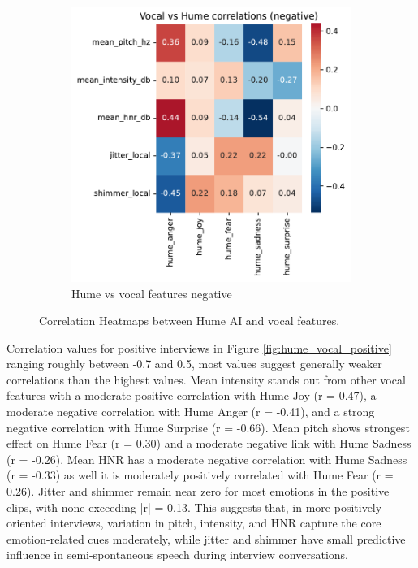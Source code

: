\begin{figure}[!h]
\begin{subfigure}[b]{0.45\textwidth}
        \includegraphics[width=\textwidth]{png/results/rq1_new/vocal_vs_hume_correlations_negative.pdf}
        \caption{Hume vs vocal features negative}        
        \label{fig:hume_vocal_negative}
    \end{subfigure}   
    \caption{Correlation Heatmaps between Hume AI and vocal features.}
    \label{fig:rq1-heatmaps}     
\end{figure}
Correlation values for positive interviews in Figure \ref{fig:hume_vocal_positive} ranging roughly between -0.7 and 0.5, most values suggest generally weaker correlations than the highest values. 
Mean intensity stands out from other vocal features with a moderate positive correlation with Hume Joy (r = 0.47), a moderate negative correlation with Hume Anger (r = -0.41), and a strong negative correlation with Hume Surprise (r = -0.66). 
Mean pitch shows strongest effect on Hume Fear (r = 0.30) and a moderate negative link with Hume Sadness (r = -0.26). 
Mean HNR has a moderate negative correlation with Hume Sadness (r = -0.33) as well it is moderately positively correlated with Hume Fear (r = 0.26). 
Jitter and shimmer remain near zero for most emotions in the positive clips, with none exceeding |r| = 0.13. This suggests that, in more positively oriented interviews, 
variation in pitch, intensity, and HNR capture the core emotion-related cues moderately, while jitter and shimmer have small predictive influence in semi-spontaneous speech during interview conversations. 

